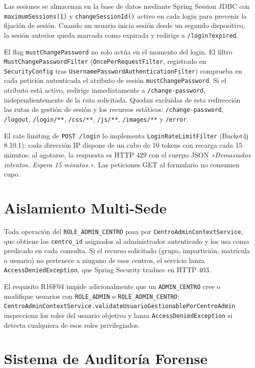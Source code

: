 \documentclass[12pt, a4paper]{report}
\begin{document}
Las sesiones se almacenan en la base de datos mediante Spring Session JDBC con
\texttt{maximumSessions(1)} y \texttt{changeSessionId()} activo en cada login para
prevenir la fijación de sesión. Cuando un usuario inicia sesión desde un segundo
dispositivo, la sesión anterior queda marcada como expirada y redirige a
\texttt{/login?expired}.

El flag \texttt{mustChangePassword} no solo actúa en el momento del login. El filtro
\texttt{MustChangePasswordFilter} (\texttt{OncePerRequestFilter}, registrado en
\texttt{SecurityConfig} tras \texttt{UsernamePasswordAuthenticationFilter}) comprueba
en cada petición autenticada el atributo de sesión \texttt{mustChangePassword}. Si el
atributo está activo, redirige inmediatamente a \texttt{/change-password},
independientemente de la ruta solicitada. Quedan excluidas de esta redirección las
rutas de gestión de sesión y los recursos estáticos:
\texttt{/change-password}, \texttt{/logout}, \texttt{/login/**}, \texttt{/css/**},
\texttt{/js/**}, \texttt{/images/**} y \texttt{/error}.

El rate limiting de \texttt{POST /login} lo implementa \texttt{LoginRateLimitFilter}
(Bucket4j 8.10.1): cada dirección IP dispone de un cubo de 10 tokens con recarga
cada 15 minutos; al agotarse, la respuesta es HTTP 429 con el cuerpo JSON
\textit{«Demasiados intentos. Espera 15 minutos.»}. Las peticiones GET al formulario
no consumen cupo.

\section{Aislamiento Multi-Sede}

Toda operación del \texttt{ROLE\_ADMIN\_CENTRO} pasa por
\texttt{CentroAdminContextService}, que obtiene los \texttt{centro\_id} asignados
al administrador autenticado y los usa como predicado en cada consulta. Si el
recurso solicitado (grupo, impartición, matrícula o usuario) no pertenece a ninguno
de esos centros, el servicio lanza \texttt{AccessDeniedException}, que Spring
Security traduce en HTTP 403.

El requisito R16F04 impide adicionalmente que un \texttt{ADMIN\_CENTRO} cree o
modifique usuarios con \texttt{ROLE\_ADMIN} o \texttt{ROLE\_ADMIN\_CENTRO}:
\texttt{CentroAdminContextService.validateUsuarioGestionablePorCentroAdmin}
inspecciona los roles del usuario objetivo y lanza \texttt{AccessDeniedException}
si detecta cualquiera de esos roles privilegiados.

\section{Sistema de Auditoría Forense}
\end{document}
